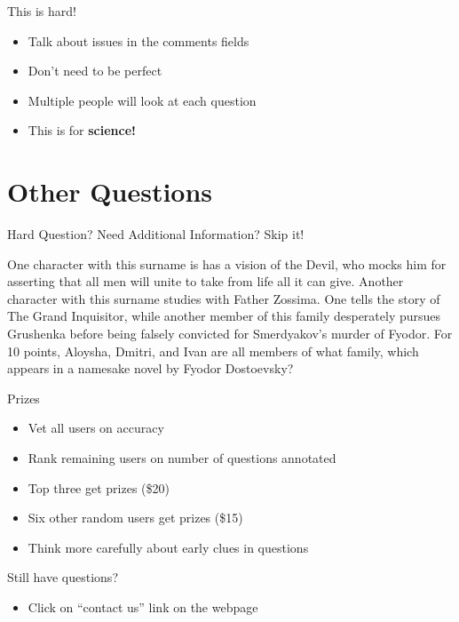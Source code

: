 \documentclass[compress]{beamer}
\begin{document}
\begin{frame}{This is hard!}

	\begin{itemize}
		\item Talk about issues in the comments fields
		\item Don't need to be perfect
		\item Multiple people will look at each question
		\item This is for {\bf science!}
	
	\end{itemize}

\end{frame}

\section{Other Questions}

\begin{frame}{Hard Question? Need Additional Information?  Skip it!}

One character with this surname is has a vision of the Devil, who mocks him for asserting that all men will unite to take from life all it can give. Another character with this surname studies with Father Zossima. One tells the story of The Grand Inquisitor, while \alert<2>{another member of this family desperately} pursues Grushenka before being falsely convicted for Smerdyakov's murder of Fyodor. For 10 points, Aloysha, Dmitri, and Ivan are all members of what family, which appears in a namesake novel by Fyodor Dostoevsky?

\end{frame}

\begin{frame}{Prizes}

  \begin{itemize}
    \item Vet all users on accuracy
    \item Rank remaining users on number of questions annotated
    \item Top three get prizes (\$20)
    \item Six other random users get prizes (\$15)
    \pause
    \item Think more carefully about early clues in questions
  \end{itemize}

\end{frame}

\begin{frame}{Still have questions?}
  \begin{itemize}
    \item Click on ``contact us'' link on the webpage
  \end{itemize}
\end{frame}
\end{document}
